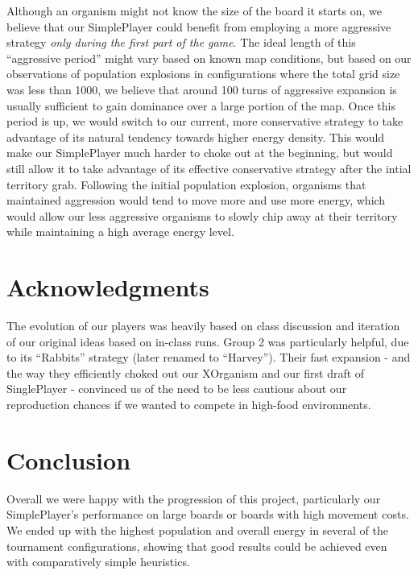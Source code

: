 \documentclass[
10pt, %
letterpaper, %
oneside, %
headinclude,footinclude, %
english
]{article}
\begin{document}
Although an organism might not know the size of the board it starts on, we believe that our SimplePlayer could benefit from employing a more aggressive strategy \textit{only during the first part of the game}. The ideal length of this ``aggressive period'' might vary based on known map conditions, but based on our observations of population explosions in configurations where the total grid size was less than 1000, we believe that around 100 turns of aggressive expansion is usually sufficient to gain dominance over a large portion of the map. Once this period is up, we would switch to our current, more conservative strategy to take advantage of its natural tendency towards higher energy density. This would make our SimplePlayer much harder to choke out at the beginning, but would still allow it to take advantage of its effective conservative strategy after the intial territory grab. Following the initial population explosion, organisms that maintained aggression would tend to move more and use more energy, which would allow our less aggressive organisms to slowly chip away at their territory while maintaining a high average energy level.

\section{Acknowledgments}

The evolution of our players was heavily based on class discussion and iteration of our original ideas based on in-class runs. Group 2 was particularly helpful, due to its ``Rabbits'' strategy (later renamed to ``Harvey''). Their fast expansion - and the way they efficiently choked out our XOrganism and our first draft of SinglePlayer - convinced us of the need to be less cautious about our reproduction chances if we wanted to compete in high-food environments.

\section{Conclusion}

Overall we were happy with the progression of this project, particularly our SimplePlayer's performance on large boards or boards with high movement costs. We ended up with the highest population and overall energy in several of the tournament configurations, showing that good results could be achieved even with comparatively simple heuristics.
\end{document}
